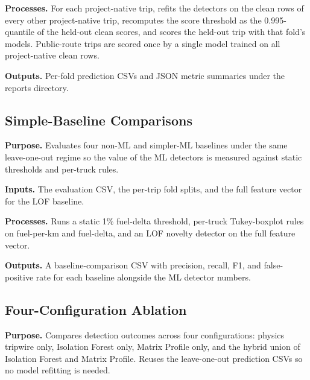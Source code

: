 \noindent\textbf{Processes.} For each project-native trip, refits the detectors on the clean rows of every other project-native trip, recomputes the score threshold as the 0.995-quantile of the held-out clean scores, and scores the held-out trip with that fold's models. Public-route trips are scored once by a single model trained on all project-native clean rows.

\noindent\textbf{Outputs.} Per-fold prediction CSVs and JSON metric summaries under the reports directory.



\subsection{Simple-Baseline Comparisons}
\label{sec:code_loto_baselines}

\noindent\textbf{Purpose.} Evaluates four non-ML and simpler-ML baselines under the same leave-one-out regime so the value of the ML detectors is measured against static thresholds and per-truck rules.

\noindent\textbf{Inputs.} The evaluation CSV, the per-trip fold splits, and the full feature vector for the LOF baseline.

\noindent\textbf{Processes.} Runs a static 1\% fuel-delta threshold, per-truck Tukey-boxplot rules on fuel-per-km and fuel-delta, and an LOF novelty detector on the full feature vector.

\noindent\textbf{Outputs.} A baseline-comparison CSV with precision, recall, F1, and false-positive rate for each baseline alongside the ML detector numbers.



\subsection{Four-Configuration Ablation}
\label{sec:code_loto_ablation}

\noindent\textbf{Purpose.} Compares detection outcomes across four configurations: physics tripwire only, Isolation Forest only, Matrix Profile only, and the hybrid union of Isolation Forest and Matrix Profile. Reuses the leave-one-out prediction CSVs so no model refitting is needed.

